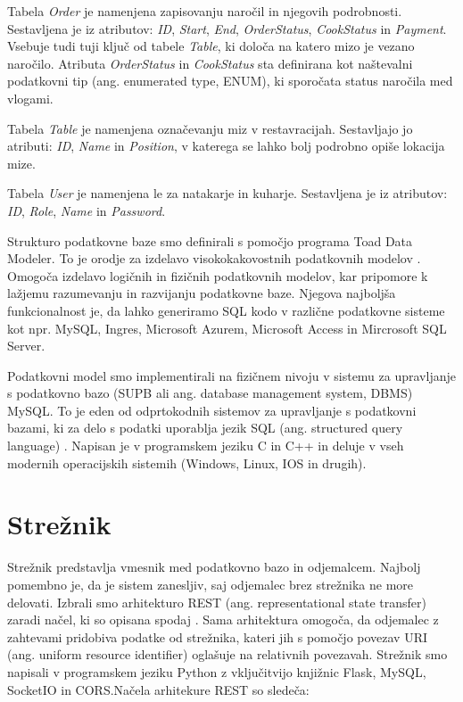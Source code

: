 \documentclass[a4paper, 12pt]{book}
\begin{document}
Tabela \textit{Order} je namenjena zapisovanju naročil in njegovih podrobnosti. Sestavljena je iz atributov: \textit{ID}, \textit{Start}, \textit{End}, \textit{OrderStatus}, \textit{CookStatus} in \textit{Payment}. Vsebuje tudi tuji ključ od tabele \textit{Table}, ki določa na katero mizo je vezano naročilo. Atributa \textit{OrderStatus} in \textit{CookStatus} sta definirana kot naštevalni podatkovni tip (ang. enumerated type, ENUM), ki sporočata status naročila med vlogami.

Tabela \textit{Table} je namenjena označevanju miz v restavracijah. Sestavljajo jo atributi: \textit{ID}, \textit{Name} in \textit{Position}, v katerega se lahko bolj podrobno opiše lokacija mize.

Tabela \textit{User} je namenjena le za natakarje in kuharje. Sestavljena je iz atributov: \textit{ID}, \textit{Role}, \textit{Name} in \textit{Password}. 

Strukturo podatkovne baze smo definirali s pomočjo programa Toad Data Modeler. To je orodje za izdelavo visokokakovostnih podatkovnih modelov \cite{Toad_Data_Modeler}. Omogoča izdelavo logičnih in fizičnih podatkovnih modelov, kar pripomore k lažjemu razumevanju in razvijanju podatkovne baze. Njegova najboljša funkcionalnost je, da lahko generiramo SQL kodo v različne podatkovne sisteme kot npr. MySQL, Ingres, Microsoft Azurem, Microsoft Access in Mircrosoft SQL Server.

Podatkovni model smo implementirali na fizičnem nivoju v sistemu za upravljanje s podatkovno bazo (SUPB ali ang. database management system, DBMS) MySQL. To je eden od odprtokodnih sistemov za upravljanje s podatkovni bazami, ki za delo s podatki uporablja jezik SQL (ang. structured query language) \cite{MySQL}. Napisan je v programskem jeziku C in C++ in deluje v vseh modernih operacijskih sistemih (Windows, Linux, IOS in drugih).


\section{Strežnik}
Strežnik predstavlja vmesnik med podatkovno bazo in odjemalcem. Najbolj pomembno je, da je sistem zanesljiv, saj odjemalec brez strežnika ne more delovati. Izbrali smo arhitekturo REST (ang. representational state transfer) zaradi načel, ki so opisana spodaj \cite{RESTAPI}. Sama arhitektura omogoča, da odjemalec z zahtevami pridobiva podatke od strežnika, kateri jih s pomočjo povezav URI (ang. uniform resource identifier) oglašuje na relativnih povezavah. Strežnik smo napisali v programskem jeziku Python z vključitvijo knjižnic Flask, MySQL, SocketIO in CORS.Načela arhitekure REST so sledeča:
\end{document}
